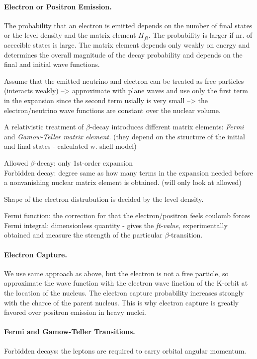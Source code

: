\documentclass[a4paper,12pt]{article}
\begin{document}
\paragraph{Electron or Positron Emission.}
The probability that an electron is emitted depends on the number of final states or the level density and the matrix element $H_{fi}$. The probability is larger if nr. of accecible states is large. The matrix element depends only weakly on energy and determines the overall magnitude of the decay probability and depends on the final and initial wave functions. 

Assume that the emitted neutrino and electron can be treated as free particles (interacts weakly) --> approximate with plane waves and use only the first term in the expansion since the second term usially is very small --> the electron/neutrino wave functions are constant over the nuclear volume. 

A relativistic treatment of $\beta$-decay introduces different matrix elements: \textit{Fermi} and \textit{Gamow-Teller matrix element.} (they depend on the structure of the initial and final states - calculated w. shell model)

Allowed $\beta$-decay: only 1st-order expansion \\
Forbidden decay: degree same as how many terms in the expansion needed before a nonvanishing nuclear matrix element is obtained. (will only look at allowed)

Shape of the electron distrubution is decided by the level density.

Fermi function: the correction for that the electron/positron feels coulomb forces \\
Fermi integral: dimensionless quantity - gives the \textit{ft-value}, experimentally obtained and measure the strength of the particular $\beta$-transition.

\paragraph{Electron Capture.}
We use same approach as above, but the electron is not a free particle, so approximate the wave function with the electron wave finction of the K-orbit at the location of the nucleus. The electron capture probability increases strongly with the charce of the parent nucleus. This is why electron capture is greatly favored over positron emission in heavy nuclei. 

\paragraph{Fermi and Gamow-Teller Transitions.}
Forbidden decays: the leptons are required to carry orbital angular momentum.
\end{document}
